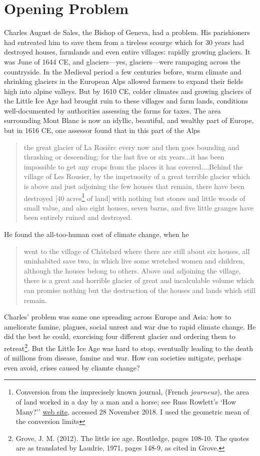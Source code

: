 \section{Opening Problem}
Charles August de Sales, the Bishop of Geneva, had a problem. His parishioners had entreated him to save them from a tireless scourge which for 30 years had destroyed houses, farmlands and even entire villages: rapidly growing glaciers. It was June of 1644 CE, and glaciers---yes, glaciers---were rampaging across the countryside. In the Medieval period a few centuries before, warm climate and shrinking glaciers in the European Alps allowed farmers to expand their fields high into alpine valleys. But by 1610 CE, colder climates and growing glaciers of the Little Ice Age had brought ruin to these villages and farm lands, conditions well-documented by authorities assessing the farms for taxes. The area surrounding Mont Blanc is now an idyllic, beautiful, and wealthy part of Europe, but in 1616 CE, one assessor found that in this part of the Alps 
\begin{quotation}
the great glacier of La Rosi\`erc every now and then goes bounding and thrashing or descending; for the last five or six years...it has been impossible to get any crops from the places it has covered....Behind the village of Les Rousier, by the impetuosity of a great terrible glacier which is above and just adjoining the few houses that remain, there have been destroyed [40 acres\footnote{Conversion from the imprecisely known journal, (French \textit{journeux}), the area of land worked in a day by a man and a horse; see Russ Rowlett's `How Many?'' \href{http://www.ibiblio.org/units/dictJ.html}{web site}, accessed 28 November 2018. I used the geometric mean of the conversion limits} of land] with nothing but stones and little woods of small value, and also eight houses, seven barns, and five little granges have been entirely ruined and destroyed.
\end{quotation}
He found the all-too-human cost of climate change, when he
\begin{quotation} 
went to the village of Ch\^atelard where there are still about six houses, all uninhabited save two, in which live some wretched women and children, although the houses belong to others. Above and adjoining the village, there is a great and horrible glacier of great and incalculable volume which can promise nothing but the destruction of the houses and lands which still remain.
\end{quotation}
Charles' problem was same one spreading across Europe and Asia: how to ameliorate famine, plagues, social unrest and war due to rapid climate change. He did the best he could, exorcising four different glacier and ordering them to retreat\footnote{Grove, J. M. (2012). The little ice age. Routledge, pages 108-10. The quotes are as translated by Laudrie, 1971, pages 148-9, as cited in Grove.}. But the Little Ice Age was hard to stop, eventually leading to the death of millions from disease, famine and war. How can societies mitigate, perhaps even avoid, crises caused by cliamte change?
